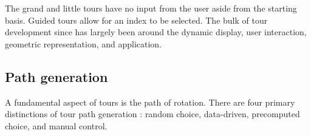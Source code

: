 \documentclass{template/monashthesis}
\begin{document}
The grand and little tours have no input from the user aside from the starting basis. Guided tours allow for an index to be selected. The bulk of tour development since has largely been around the dynamic display, user interaction, geometric representation, and application.

\hypertarget{sec:path_generation}{%
\subsection{Path generation}\label{sec:path_generation}}

A fundamental aspect of tours is the path of rotation. There are four primary distinctions of tour path generation \autocite{buja_computational_2005}: random choice, data-driven, precomputed choice, and manual control.
\end{document}
